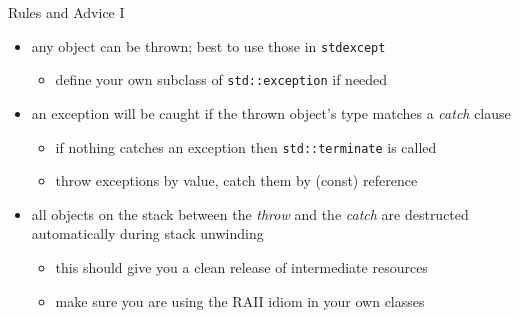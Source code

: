 \begin{frame}[fragile]
  \begin{block}{Rules and Advice I}
    \begin{itemize}
      \item any object can be thrown; best to use those in \texttt{stdexcept}
      \begin{itemize}
        \item define your own subclass of \texttt{std::exception} if needed
      \end{itemize}
      \item an exception will be caught if the thrown object's type matches a \textit{catch} clause
      \begin{itemize}
          \item if nothing catches an exception then \texttt{std::terminate} is called
          \item throw exceptions by value, catch them by (const) reference
      \end{itemize}
      \item all objects on the stack between the \textit{throw} and the \textit{catch} are destructed automatically during stack unwinding
      \begin{itemize}
        \item this should give you a clean release of intermediate resources
        \item make sure you are using the RAII idiom in your own classes
      \end{itemize}
    \end{itemize}
  \end{block}
\end{frame}

